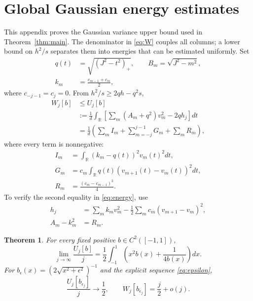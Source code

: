\documentclass[aps,pra,reprint,superscriptaddress,longbibliography]{revtex4-2}
\newtheorem{theorem}{Theorem}
\theoremstyle{remark}
\newcommand{\R}{\mathbb R}
\begin{document}
\section{Global Gaussian energy estimates}\label{sec:energy-proof}
This appendix proves the Gaussian variance upper bound used in
Theorem~\ref{thm:main}. The denominator in \eqref{eq:W} couples all
columns; a lower bound on $h^2/s$ separates them into energies
that can be estimated uniformly. Set
\begin{equation}
\begin{aligned}
q(t)&=\sqrt{(J^2-t^2)_+},\qquad B_m=\sqrt{J^2-m^2},\\
k_m&=\frac{c_{m-1}+c_m}{2},
\end{aligned}
\label{eq:q}
\end{equation}
where $c_{-j-1}=c_j=0$. From $h^2/s\geq2qh-q^2s$,
\begin{equation}
\begin{aligned}
W_j[b]&\leq U_j[b]\\
&:=\frac1d\int_\R
\left[\sum_m(A_m+q^2)v_m^2-2qh_j\right]dt\\
&=\frac1d\left(\sum_m I_m+\sum_{m=-j}^{j-1}G_m+\sum_m R_m\right),
\end{aligned}
\label{eq:energy}
\end{equation}
where every term is nonnegative:
\begin{equation}
\begin{aligned}
I_m&=\int_\R(k_m-q(t))^2v_m(t)^2dt,\\
G_m&=c_m\int_\R q(t)(v_{m+1}(t)-v_m(t))^2dt,\\
R_m&=\frac{(c_m-c_{m-1})^2}{4}.
\end{aligned}
\label{eq:energies}
\end{equation}
To verify the second equality in \eqref{eq:energy}, use
\begin{align*}
 h_j&=\sum_m k_mv_m^2-\frac12\sum_m c_m(v_{m+1}-v_m)^2,\\
 A_m-k_m^2&=R_m.
\end{align*}

\begin{theorem}\label{thm:energy}
For every fixed positive $b\in C^2([-1,1])$,
\begin{equation}
 \lim_{j\to\infty}\frac{U_j[b]}j
 =\frac12\int_{-1}^1
 \left(x^2b(x)+\frac1{4b(x)}\right)dx.
 \label{eq:functional}
\end{equation}
For $b_\epsilon(x)=(2\sqrt{x^2+\epsilon^2})^{-1}$ and the explicit
sequence \eqref{eq:epsilon},
\begin{equation}
 \frac{U_j[b_{\epsilon_j}]}j\longrightarrow\frac12,
 \qquad W_j[b_{\epsilon_j}]=\frac j2+o(j).
 \label{eq:explicit-energy}
\end{equation}
\end{theorem}
\end{document}

